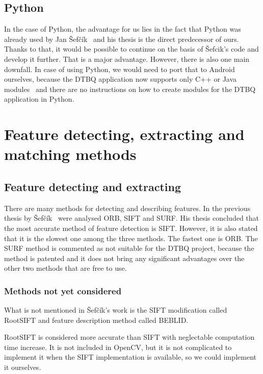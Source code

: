 \documentclass[thesis=B,english]{FITthesis}[2019/12/23]
\begin{document}
            \subsection{Python}
                In the case of Python, the advantage for us lies in the fact that Python was already used by Jan Šefčík~\cite{Sefcik2020} and his thesis is the direct predecessor of ours. Thanks to that, it would be possible to continue on the basis of Šefcik's code and develop it further. That is a major advantage. However, there is also one main downfall. In case of using Python, we would need to port that to Android ourselves, because the DTBQ application now supports only C++ or Java modules~\cite{Stepan2019} and there are no instructions on how to create modules for the DTBQ application in Python.

        \section{Feature detecting, extracting and matching methods}
            \subsection{Feature detecting and extracting}
                There are many methods for detecting and describing features. In the previous thesis by Šefčík~\cite{Sefcik2020} were analysed ORB, SIFT and SURF. His thesis concluded that the most accurate method of feature detection is SIFT. However, it is also stated that it is the slowest one among the three methods. The fastest one is ORB. The SURF method is commented as not suitable for the DTBQ project, because the method is patented and it does not bring any significant advantages over the other two methods that are free to use.
                
                \subsubsection*{Methods not yet considered}
                What is not mentioned in Šefčík's work is the SIFT modification called RootSIFT and feature description method called BEBLID.
                 
                RootSIFT is considered more accurate than SIFT with neglectable computation time increase. It is not included in OpenCV, but it is not complicated to implement it when the SIFT implementation is available, so we could implement it ourselves.
                
\end{document}
